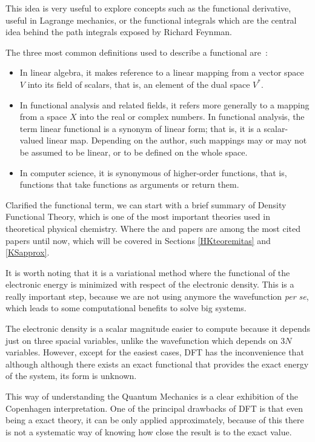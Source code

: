 This idea is very useful to explore concepts such as the functional
derivative, useful in Lagrange mechanics, or the functional integrals which are
the central idea behind the path integrals exposed by Richard Feynman.

The three most common definitions used to describe a functional are~\cite{1990}:

\begin{itemize}
\item In linear algebra, it makes reference to a linear mapping from a vector space $V$
into its field of scalars, that is, an element of the dual space $V^{*}$.
\item In functional analysis and related fields, it refers more generally to a mapping
from a space $X$ into the real or complex numbers. In functional analysis, the term
linear functional is a synonym of linear form; that is, it
is a scalar-valued linear map. Depending on the author, such mappings may or may
not be assumed to be linear, or to be defined on the whole space.
\item In computer science, it is synonymous of higher-order functions, that
is, functions that take functions as arguments or return them.
\end{itemize}

Clarified the functional term, we can start with a brief summary of Density
Functional Theory, which is one of the most important theories used in
theoretical physical chemistry. Where the \citet*{Hohenberg1964} and
\citet*{Kohn1965} papers are among the most cited papers until now, which will
be covered in Sections \ref{HKteoremitas} and \ref{KSapprox}.

It is worth noting that it is a variational
method where the functional of the electronic energy is minimized
with respect of the electronic density. This is a really important step,
because we are not using anymore the wavefunction \textit{per se},
which leads to some computational benefits to solve big systems.

\pagebreak

The electronic density is a scalar magnitude easier to compute because it
depends just on three spacial variables, unlike the wavefunction which depends
on 3$N$ variables. However, except for the easiest cases, DFT has the
inconvenience that although although there exists an exact functional that
provides the exact energy of the system, its form is unknown.

This way of understanding the Quantum Mechanics is a clear exhibition of the
Copenhagen interpretation.  One of the principal drawbacks of DFT is that even
being a exact theory, it can be only applied approximately, because
of this there is not a systematic way of knowing how close the result is to the
exact value. 

